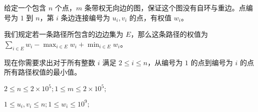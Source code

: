 给定一个包含 $n$ 个点，$m$ 条带权无向边的图，保证这个图没有自环与重边。点编号为 $1$ 到 $n$，第 $i$ 条边连接编号为 $u_i,v_i$ 的点，有权值 $w_i$。

我们规定若一条路径所包含的边边集为 $E$，那么这条路径的权值为 $\sum_{i\in E}w_i-\max_{i\in E}w_i+\min_{i\in E}w_i$。

现在你需要求出对于所有整数 $i$ 满足 $2\leq i\leq n$，从编号为 $1$ 的点到编号为 $i$ 的点所有路径权值的最小值。

$2\leq n\leq2\times10^5;1\leq m\leq2\times10^5;$

$1\leq u_i,v_i\leq n;1\leq w_i\leq10^9;$